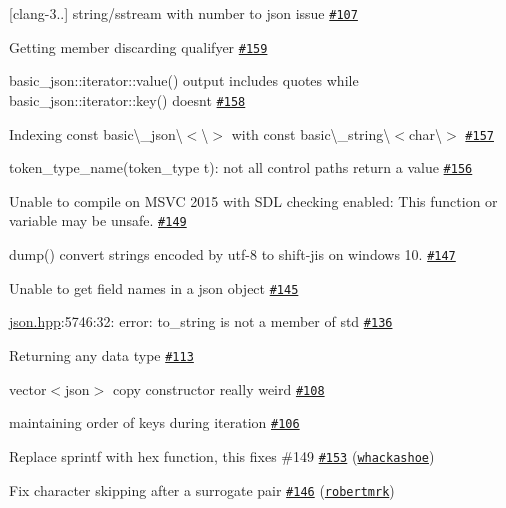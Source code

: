 \begin{DoxyItemize}
\item \mbox{[}clang-\/3..\mbox{]} string/sstream with number to json issue \href{https://github.com/nlohmann/json/issues/107}{\tt \#107}
\item Getting member discarding qualifyer \href{https://github.com/nlohmann/json/issues/159}{\tt \#159}
\item basic\+\_\+json\+::iterator\+::value() output includes quotes while basic\+\_\+json\+::iterator\+::key() doesn\textquotesingle{}t \href{https://github.com/nlohmann/json/issues/158}{\tt \#158}
\item Indexing {\ttfamily const basic\textbackslash{}\+\_\+json\textbackslash{}$<$\textbackslash{}$>$} with {\ttfamily const basic\textbackslash{}\+\_\+string\textbackslash{}$<$char\textbackslash{}$>$} \href{https://github.com/nlohmann/json/issues/157}{\tt \#157}
\item token\+\_\+type\+\_\+name(token\+\_\+type t)\+: not all control paths return a value \href{https://github.com/nlohmann/json/issues/156}{\tt \#156}
\item Unable to compile on M\+S\+VC 2015 with S\+DL checking enabled\+: This function or variable may be unsafe. \href{https://github.com/nlohmann/json/issues/149}{\tt \#149}
\item dump() convert strings encoded by utf-\/8 to shift-\/jis on windows 10. \href{https://github.com/nlohmann/json/issues/147}{\tt \#147}
\item Unable to get field names in a json object \href{https://github.com/nlohmann/json/issues/145}{\tt \#145}
\item \hyperlink{a00257_source}{json.\+hpp}\+:5746\+:32\+: error\+: \textquotesingle{}to\+\_\+string\textquotesingle{} is not a member of \textquotesingle{}std\textquotesingle{} \href{https://github.com/nlohmann/json/issues/136}{\tt \#136}
\item Returning any data type \href{https://github.com/nlohmann/json/issues/113}{\tt \#113}
\item vector$<$json$>$ copy constructor really weird \href{https://github.com/nlohmann/json/issues/108}{\tt \#108}
\item maintaining order of keys during iteration \href{https://github.com/nlohmann/json/issues/106}{\tt \#106}
\item Replace sprintf with hex function, this fixes \#149 \href{https://github.com/nlohmann/json/pull/153}{\tt \#153} (\href{https://github.com/whackashoe}{\tt whackashoe})
\item Fix character skipping after a surrogate pair \href{https://github.com/nlohmann/json/pull/146}{\tt \#146} (\href{https://github.com/robertmrk}{\tt robertmrk})

\end{DoxyItemize}

